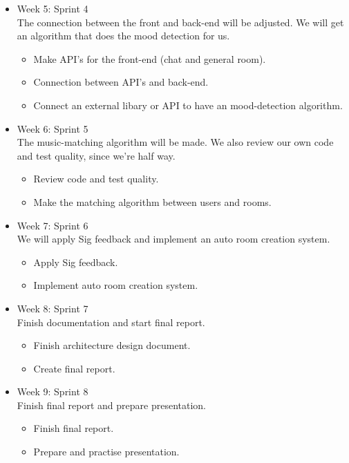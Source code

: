 \begin{itemize}
\item Week 5: Sprint 4\\
The connection between the front and back-end will be adjusted. We will get an algorithm that does the mood detection for us.

\begin{itemize}
\item Make API's for the front-end (chat and general room).
\item Connection between API's and back-end.
\item Connect an external libary or API to have an mood-detection algorithm.
\end{itemize}

\item Week 6: Sprint 5\\
The music-matching algorithm will be made. We also review our own code and test quality, since we're half way.

\begin{itemize}
\item Review code and test quality.
\item Make the matching algorithm between users and rooms.
\end{itemize}

\item Week 7: Sprint 6\\
We will apply Sig feedback and implement an auto room creation system.

\begin{itemize}
\item Apply Sig feedback.
\item Implement auto room creation system.
\end{itemize}

\item Week 8: Sprint 7\\
Finish documentation and start final report.

\begin{itemize}
\item Finish architecture design document.
\item Create final report.
\end{itemize}


\item Week 9: Sprint 8\\
Finish final report and prepare presentation.

\begin{itemize}
\item Finish final report.
\item Prepare and practise presentation.
\end{itemize}


\end{itemize}

